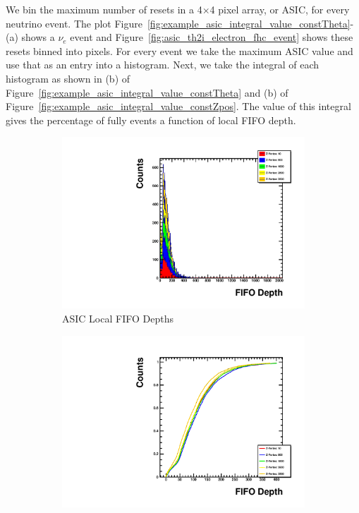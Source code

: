 We bin the maximum number of resets in a 4$\times$4 pixel array, or ASIC, for every neutrino event.
The plot Figure~\ref{fig:example_asic_integral_value_constTheta}-(a) shows a $\nu_{e}$ event and Figure~\ref{fig:asic_th2i_electron_fhc_event} shows these resets binned into pixels.
For every event we take the maximum ASIC value and use that as an entry into a histogram.
Next, we take the integral of each histogram as shown in (b) of Figure~\ref{fig:example_asic_integral_value_constTheta} and (b) of Figure~\ref{fig:example_asic_integral_value_constZpos}.
The value of this integral gives the percentage of fully events a function of local FIFO depth.

\begin{figure}
\centering
\begin{subfigure}{.5\textwidth}
  \centering
  \includegraphics[width=\textwidth]{images/Const_Theta0_ASIC_stack_integral_pdg12_fhc.pdf}
  \caption{ASIC Local FIFO Depths}
\end{subfigure}%
\begin{subfigure}{.5\textwidth}
  \centering
  \includegraphics[width=\textwidth]{images/Const_Theta0_ASIC_integral_pdg12_fhc.pdf}

\end{subfigure}
\end{figure}
